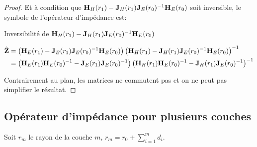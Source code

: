 \begin{proof}
            Et à condition que \(\mH_{H}(r_1) - \mJ_{H}(r_1)\mJ_{E}(r_0)^{-1}\mH_{E}(r_0)\) soit inversible, le symbole de l'opérateur d'impédance est:
            \begin{TODO}
              Inversibilité de \(\mH_{H}(r_1) - \mJ_{H}(r_1)\mJ_{E}(r_0)^{-1}\mH_{E}(r_0)\)
            \end{TODO}
            \begin{align}
                \hat \mZ &= 
                \left(\mH_{E}(r_1) - \mJ_{E}(r_1)\mJ_{E}(r_0)^{-1}\mH_{E}(r_0)\right)
                \left(\mH_{H}(r_1) - \mJ_{H}(r_1)\mJ_{E}(r_0)^{-1}\mH_{E}(r_0)\right)^{-1}
                \\
                &=
                \left(\mH_{E}(r_1)\mH_{E}(r_0)^{-1} - \mJ_{E}(r_1)\mJ_{E}(r_0)^{-1}\right)
                \left(\mH_{H}(r_1)\mH_{E}(r_0)^{-1} - \mJ_{H}(r_1)\mJ_{E}(r_0)^{-1}\right)^{-1}
            \end{align}

            Contrairement au plan, les matrices ne commutent pas et on ne peut pas simplifier le résultat.

        \end{proof}



    \subsection{Opérateur d'impédance pour plusieurs couches}

        \begin{figure}[!hbt]
            \centering
            \begin{tikzpicture}
                
            \end{tikzpicture}
        \end{figure}

        Soit \(r_m\) le rayon de la couche \(m\), \(r_m = r_0 +\sum_{i=1}^{m} d_{i}\). 

